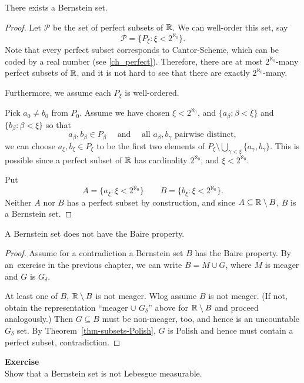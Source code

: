 \begin{theorem}\label{thm-bernstein}There exists a Bernstein set.

\end{theorem}\begin{proof}Let $\mathcal{P}$ be the set of perfect subsets of $\mathbb{R}$. We can well-order this set, say
\begin{equation*}
\mathcal{P} = \{P_\xi \colon \xi < 2^{\aleph_0} \}.
\end{equation*}
Note that every perfect subset corresponds to Cantor-Scheme, which can be coded by a real number (see \ref{ch_perfect}). Therefore, there are at most $2^{\aleph_0}$-many perfect subsets of $\mathbb{R}$, and it is not hard to see that there are exactly $2^{\aleph_0}$-many.

Furthermore, we assume each $P_\xi$ is well-ordered.

Pick $a_0 \neq b_0$ from $P_0$. Assume we have chosen $\xi < 2^{\aleph_0}$, and $\{a_\beta\colon \beta < \xi \}$ and $\{b_\beta\colon \beta < \xi \}$ so that
\begin{equation*}
a_\beta, b_\beta \in P_\beta \quad \text{ and } \quad \text{all $a_\beta, b_\gamma$ pairwise distinct},
\end{equation*}
we can choose $a_\xi, b_\xi \in P_\xi$ to be the first two elements of $P_\xi \setminus \bigcup_{\gamma < \xi} \{a_\gamma, b_\gamma\}$. This is possible since a perfect subset of $\mathbb{R}$ has cardinality $2^{\aleph_0}$, and $\xi< 2^{\aleph_0}$.

Put
\begin{equation*}
A = \{a_\xi \colon \xi < 2^{\aleph_0} \} \qquad B = \{b_\xi \colon \xi < 2^{\aleph_0} \}.
\end{equation*}
Neither $A$ nor $B$ has a perfect subset by construction, and since $A \subseteq \mathbb{R}\setminus B$, $B$ is a Bernstein set.

\end{proof}\begin{proposition}\label{prop-bernstein-bp}A Bernstein set does not have the Baire property.

\end{proposition}\begin{proof}Assume for a contradiction a Bernstein set $B$ has the Baire property. By an~exercise in the previous chapter, we can write $B = M \cup G$, where $M$ is meager and $G$ is $G_\delta$.

At least one of $B$, $\mathbb{R}\setminus B$ is not meager. Wlog assume $B$ is not meager. (If not, obtain the representation ``meager $\cup$ $G_\delta$'' above for $\mathbb{R}\setminus B$ and proceed analogously.) Then $G \subseteq B$ must be non-meager, too, and hence is an uncountable $G_\delta$ set. By Theorem~\ref{thm-subsets-Polish}, $G$ is Polish and hence must contain a perfect subset, contradiction.

\end{proof}\begin{framed}
\textbf{Exercise}\\
Show that a Bernstein set is not Lebesgue measurable.
\end{framed}

